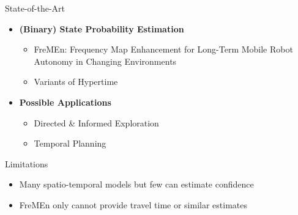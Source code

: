\documentclass{beamer}
\begin{document}
\begin{frame}[t]{State-of-the-Art}

  \begin{itemize}
  \setlength\itemsep{1.5em}
    \item \textbf{(Binary) State Probability Estimation}
      \begin{itemize}
        \item \scriptsize FreMEn: Frequency Map Enhancement for Long-Term Mobile Robot Autonomy in Changing Environments \cite{Krajnik2015}
        \item \scriptsize Variants of Hypertime \cite{Krajnik2018} \normalsize
      \end{itemize}

    \item \textbf{Possible Applications}
      \begin{itemize}
        \item Directed \& Informed Exploration \cite{strands2017}
        \item Temporal Planning \cite{dream2019}
      \end{itemize}
  \end{itemize}

  \vspace*{0.50cm}
  \begin{block}{Limitations}
    \begin{itemize}
      \item Many spatio-temporal models but few can estimate confidence
      \item FreMEn only cannot provide travel time or similar estimates
    \end{itemize}
  \end{block}

\end{frame}
\end{document}
